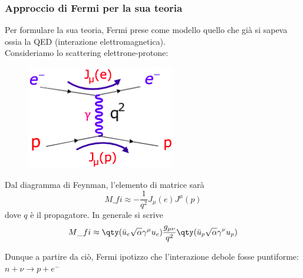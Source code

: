 \subsubsection{Approccio di Fermi per la sua teoria}
Per formulare la sua teoria, Fermi prese come modello quello che già si sapeva ossia la QED (interazione elettromagnetica). \\
Consideriamo lo scattering elettrone-protone:\\
\begin{minipage}{0.3\textwidth}
    \begin{figure}[H]
        \centering
        \includegraphics[width=\textwidth]{immagini/fig_electron_proton_scattering.png}
    \end{figure}
\end{minipage}
\begin{minipage}{0.65\textwidth}
    Dal diagramma di Feynman, l'elemento di matrice sarà
    \begin{equation*}
    M\_{fi}\approx-\frac{1}{q^2}J_\mu(e)J^\mu(p)
    \end{equation*} 
    dove $q$ è il propagatore. In generale si scrive 
    \begin{equation*}
    M\_{fi}\approx\qty(\bar u_e\sqrt\alpha\gamma^\mu u_e)\frac{g_{\mu\nu}}{q^2}\qty(\bar u_p\sqrt\alpha\gamma^\nu u_p)
    \end{equation*} 
\end{minipage}
Dunque a partire da ciò, Fermi ipotizzo che l'interazione debole fosse puntiforme: $n+\nu\to p+e^-$\\
